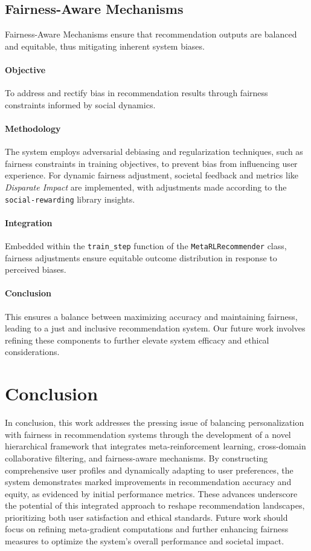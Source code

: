\documentclass{article} %
\begin{document}
\subsection{Fairness-Aware Mechanisms}

Fairness-Aware Mechanisms ensure that recommendation outputs are balanced and equitable, thus mitigating inherent system biases.

\paragraph{Objective}
To address and rectify bias in recommendation results through fairness constraints informed by social dynamics.

\paragraph{Methodology}
The system employs adversarial debiasing and regularization techniques, such as fairness constraints in training objectives, to prevent bias from influencing user experience. For dynamic fairness adjustment, societal feedback and metrics like \emph{Disparate Impact} are implemented, with adjustments made according to the \texttt{social-rewarding} library insights.

\paragraph{Integration}
Embedded within the \texttt{train\_step} function of the \texttt{MetaRLRecommender} class, fairness adjustments ensure equitable outcome distribution in response to perceived biases.

\paragraph{Conclusion}
This ensures a balance between maximizing accuracy and maintaining fairness, leading to a just and inclusive recommendation system. Our future work involves refining these components to further elevate system efficacy and ethical considerations.



\section{Conclusion}

In conclusion, this work addresses the pressing issue of balancing personalization with fairness in recommendation systems through the development of a novel hierarchical framework that integrates meta-reinforcement learning, cross-domain collaborative filtering, and fairness-aware mechanisms. By constructing comprehensive user profiles and dynamically adapting to user preferences, the system demonstrates marked improvements in recommendation accuracy and equity, as evidenced by initial performance metrics. These advances underscore the potential of this integrated approach to reshape recommendation landscapes, prioritizing both user satisfaction and ethical standards. Future work should focus on refining meta-gradient computations and further enhancing fairness measures to optimize the system's overall performance and societal impact.




\end{document}
